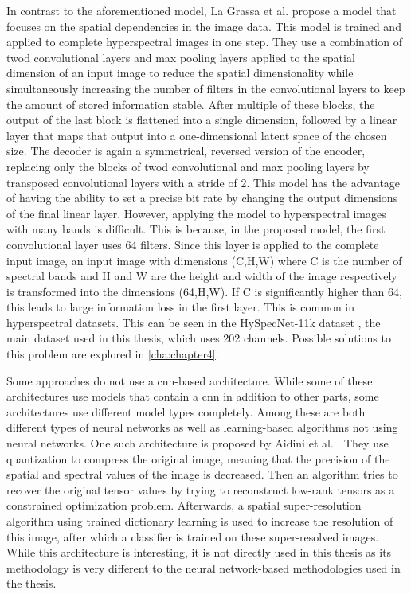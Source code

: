 In contrast to the aforementioned model, La Grassa et al. \citep{la_grassa_hyperspectral_2022} propose a model that focuses on the spatial dependencies in the image data. This model is trained and applied to complete hyperspectral images in one step. They use a combination of \ac{twod} convolutional layers and max pooling layers applied to the spatial dimension of an input image to reduce the spatial dimensionality while simultaneously increasing the number of filters in the convolutional layers to keep the amount of stored information stable. After multiple of these blocks, the output of the last block is flattened into a single dimension, followed by a linear layer that maps that output into a one-dimensional latent space of the chosen size. The decoder is again a symmetrical, reversed version of the encoder, replacing only the blocks of \ac{twod} convolutional and max pooling layers by transposed convolutional layers with a stride of 2. This model has the advantage of having the ability to set a precise bit rate by changing the output dimensions of the final linear layer. However, applying the model to hyperspectral images with many bands is difficult. This is because, in the proposed model, the first convolutional layer uses 64 filters. Since this layer is applied to the complete input image, an input image with dimensions (C,H,W) where C is the number of spectral bands and H and W are the height and width of the image respectively is transformed into the dimensions (64,H,W). If C is significantly higher than 64, this leads to large information loss in the first layer. This is common in hyperspectral datasets. This can be seen in the HySpecNet-11k dataset \citep{fuchs_hyspecnet-11k_2023}, the main dataset used in this thesis, which uses 202 channels. Possible solutions to this problem are explored in \autoref{cha:chapter4}.

Some approaches do not use a \ac{cnn}-based architecture. While some of these architectures use models that contain a \ac{cnn} in addition to other parts, some architectures use different model types completely. Among these are both different types of neural networks as well as learning-based algorithms not using neural networks.
One such architecture is proposed by Aidini et al. \citep{aidini_hyperspectral_2019}. They use quantization to compress the original image, meaning that the precision of the spatial and spectral values of the image is decreased. Then an algorithm tries to recover the original tensor values by trying to reconstruct low-rank tensors as a constrained optimization problem. Afterwards, a spatial super-resolution algorithm using trained dictionary learning is used to increase the resolution of this image, after which a classifier is trained on these super-resolved images. While this architecture is interesting, it is not directly used in this thesis as its methodology is very different to the neural network-based methodologies used in the thesis.

